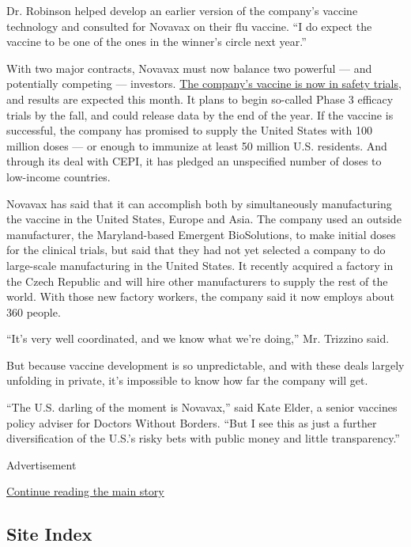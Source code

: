 Dr. Robinson helped develop an earlier version of the company's vaccine
technology and consulted for Novavax on their flu vaccine. ``I do expect
the vaccine to be one of the ones in the winner's circle next year.''

With two major contracts, Novavax must now balance two powerful --- and
potentially competing --- investors.
\href{https://www.nytimes.com/interactive/2020/science/coronavirus-vaccine-tracker.html}{The
company's vaccine is now in safety trials}, and results are expected
this month. It plans to begin so-called Phase 3 efficacy trials by the
fall, and could release data by the end of the year. If the vaccine is
successful, the company has promised to supply the United States with
100 million doses --- or enough to immunize at least 50 million U.S.
residents. And through its deal with CEPI, it has pledged an unspecified
number of doses to low-income countries.

Novavax has said that it can accomplish both by simultaneously
manufacturing the vaccine in the United States, Europe and Asia. The
company used an outside manufacturer, the Maryland-based Emergent
BioSolutions, to make initial doses for the clinical trials, but said
that they had not yet selected a company to do large-scale manufacturing
in the United States. It recently acquired a factory in the Czech
Republic and will hire other manufacturers to supply the rest of the
world. With those new factory workers, the company said it now employs
about 360 people.

``It's very well coordinated, and we know what we're doing,'' Mr.
Trizzino said.

But because vaccine development is so unpredictable, and with these
deals largely unfolding in private, it's impossible to know how far the
company will get.

``The U.S. darling of the moment is Novavax,'' said Kate Elder, a senior
vaccines policy adviser for Doctors Without Borders. ``But I see this as
just a further diversification of the U.S.'s risky bets with public
money and little transparency.''

Advertisement

\protect\hyperlink{after-bottom}{Continue reading the main story}

\hypertarget{site-index}{%
\subsection{Site Index}\label{site-index}}

